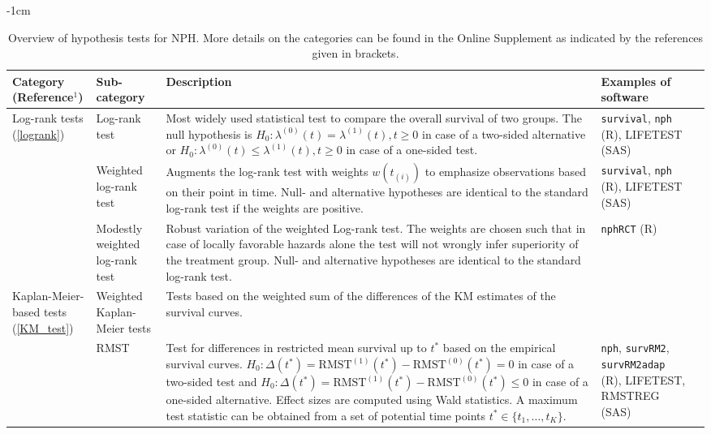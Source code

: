 \documentclass{article}
\begin{document}
\noindent \textit{}

\begin{center}
\begin{landscape}
   
\begin{table}[!htbpt!]
    \caption{Overview of hypothesis tests for NPH. More details on the categories can be found in the Online Supplement as indicated by the references given in brackets.}
    \label{tab:test_overview}
    \centering
    \small
    \addtolength{\leftskip} {-1cm}
    \addtolength{\rightskip}{-1cm}
    \begin{tabulary}{\linewidth} {|L|L|L|L|L|}
 \hline
Category (Reference$^1$) & Sub-category & Description  & Examples of software \\
 \hline \hline
Log-rank tests (\ref{logrank}) & Log-rank test & Most widely used statistical
test to compare the overall survival of two groups. The null hypothesis is $H_0: \lambda^{(0)} (t) = \lambda^{(1)} (t), t \geq 0$ in case of a two-sided alternative or  $H_0: \lambda^{(0)} (t) \leq \lambda^{(1)} (t), t \geq 0$ in case of a one-sided test. &   \texttt{survival}, \texttt{nph} (R), LIFETEST (SAS) \\
& Weighted log-rank test   & Augments the log-rank test with weights $w(t_{(i)})$ to emphasize observations based on their point in time. Null- and alternative hypotheses are identical to the standard log-rank test if the weights are positive.  & \texttt{survival}, \texttt{nph} (R), LIFETEST (SAS) \\
& Modestly weighted log-rank test  & Robust variation of the weighted Log-rank test. The weights are chosen such that in case of locally favorable hazards alone the test will not wrongly infer superiority of the treatment group. Null- and alternative hypotheses are identical to the standard log-rank test.  & \texttt{nphRCT} (R) \\
\hline
Kaplan-Meier-based tests (\ref{KM_test}) & Weighted Kaplan-Meier tests & Tests based on the weighted sum of the differences of the KM estimates of the survival curves.  &  \\
& RMST & Test for differences in restricted mean survival up to $t^*$ based on the empirical survival curves. $H_0: \Delta (t^*) = \text{RMST}^{(1)}(t^*) - \text{RMST}^{(0)}(t^*) = 0$ in case of a two-sided test and $H_0: \Delta (t^*) = \text{RMST}^{(1)}(t^*) - \text{RMST}^{(0)}(t^*) \leq 0$ in case of a one-sided alternative. Effect sizes are computed using Wald statistics. A maximum test statistic can be obtained from a set of potential time points $t^* \in \{t_1,\ldots, t_K\}$. &  \texttt{nph}, \texttt{survRM2}, \texttt{survRM2adap} (R), LIFETEST, RMSTREG (SAS) \\

\end{tabulary}
\end{table}
\end{landscape}
\end{center}
\end{document}

